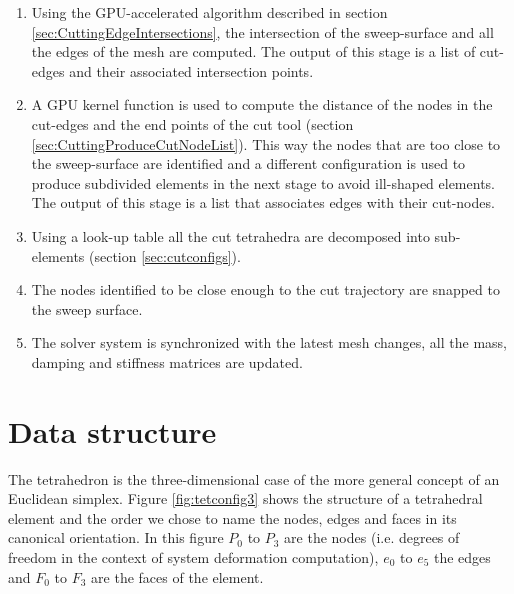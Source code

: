 \begin{enumerate}
 \item Using the GPU-accelerated algorithm described in section \ref{sec:CuttingEdgeIntersections}, the intersection of the 
 sweep-surface and all the edges of the mesh are computed. The output of this stage is a list of cut-edges and their associated 
 intersection points. 
 
 \item A GPU kernel function is used to compute the distance of the nodes in the cut-edges and the end points of 
 the cut tool (section \ref{sec:CuttingProduceCutNodeList}). This way the nodes that are too close to the sweep-surface are identified and a different configuration 
 is used to produce subdivided elements in the next stage to avoid ill-shaped elements. The output of this stage is 
 a list that associates edges with their cut-nodes.
 
 \item Using a look-up table all the cut tetrahedra are decomposed into sub-elements (section \ref{sec:cutconfigs}). 
 
 \item The nodes identified to be close enough to the cut trajectory are snapped to the sweep surface.
 
 \item The solver system is synchronized with the latest mesh changes, all the mass, damping and stiffness 
 matrices are updated.
\end{enumerate}


\section{Data structure}
The tetrahedron is the three-dimensional case of the more general concept of an Euclidean simplex. 
Figure \ref{fig:tetconfig3} shows the structure of a tetrahedral element and the order we chose to 
name the nodes, edges and faces in its canonical orientation. In this figure $P_0$ to $P_3$ are
the nodes (i.e. degrees of freedom in the context of system deformation computation), $e_0$ to $e_5$ the edges 
and $F_0$ to $F_3$ are the faces of the element.

